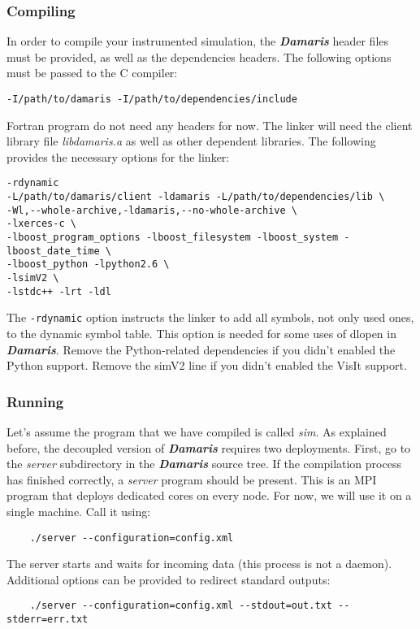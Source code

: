 \documentclass[11pt]{report}
\newcommand{\Damaris}{\emph{\textbf{Damaris}}}
\newcommand{\file}[1]{\emph{#1}}
\begin{document}
\subsubsection{Compiling}

In order to compile your instrumented simulation, the \Damaris{} header files must be
provided, as well as the dependencies headers. The following options must be passed to the C compiler:

\begin{verbatim}
-I/path/to/damaris -I/path/to/dependencies/include
\end{verbatim}
Fortran program do not need any headers for now.
The linker will need the client library file \file{libdamaris.a} as well as other dependent libraries.
The following provides the necessary options for the linker:
\begin{verbatim}
-rdynamic
-L/path/to/damaris/client -ldamaris -L/path/to/dependencies/lib \
-Wl,--whole-archive,-ldamaris,--no-whole-archive \
-lxerces-c \
-lboost_program_options -lboost_filesystem -lboost_system -lboost_date_time \
-lboost_python -lpython2.6 \
-lsimV2 \
-lstdc++ -lrt -ldl
\end{verbatim}

The \texttt{-rdynamic} option instructs the linker to add all symbols, not only used ones, 
to the dynamic symbol table. 
This option is needed for some uses of dlopen in \Damaris{}.
Remove the Python-related dependencies if you didn't enabled the Python support.
Remove the simV2 line if you didn't enabled the VisIt support.

\subsubsection{Running}

Let's assume the program that we have compiled is called \file{sim}. As explained before,
the decoupled version of \Damaris{} requires two deployments.
First, go to the \file{server} subdirectory in the \Damaris{} source tree. If the compilation process
has finished correctly, a \file{server} program should be present. This is an MPI program that deploys
dedicated cores on every node. For now, we will use it on a single machine.
Call it using:
\begin{verbatim}
	./server --configuration=config.xml
\end{verbatim}
The server starts and waits for incoming data (this process is not a daemon). Additional options can be provided
to redirect standard outputs:
\begin{verbatim}
	./server --configuration=config.xml --stdout=out.txt --stderr=err.txt
\end{verbatim}
\end{document}
